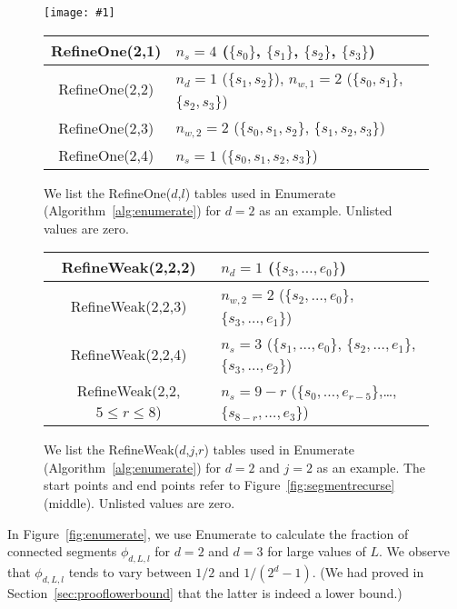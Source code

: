 \documentclass[a4paper,11pt]{article}
\newcommand{\inputtikz}[1]{\texttt{[image: \#1]}}
\newcommand{\figlab}[1]{\label{fig:#1}}
\newcommand{\figref}[1]{Figure~\ref{fig:#1}}
\newcommand{\secref}[1]{Section~\ref{sec:#1}}
\newcommand{\algref}[1]{Algorithm~\ref{alg:#1}}
\begin{document}
\begin{figure}\centering
  \inputtikz{refineone}

  \null

  \renewcommand{\arraystretch}{1.1}
  \begin{tabular}{|c|l|}\hline
    RefineOne(2,1) & $n_s = 4$ ($\{s_0\}$, $\{s_1\}$, $\{s_2\}$,
    $\{s_3\}$)
    \\ \hline
    RefineOne(2,2) & $n_d = 1$ ($\{s_1,s_2\}$), $n_{w,1} = 2$ ($\{s_0,s_1\}$,
    $\{s_2,s_3\}$)
    \\ \hline
    RefineOne(2,3) & $n_{w,2} = 2$ ($\{s_0,s_1,s_2\}$, $\{s_1,s_2,s_3\}$)
    \\ \hline
    RefineOne(2,4) & $n_s = 1$ ($\{s_0,s_1,s_2,s_3\}$)
    \\ \hline
  \end{tabular}
  \caption{We list the RefineOne($d$,$l$) tables used in Enumerate
    (\algref{enumerate}) for $d=2$ as an example.  Unlisted values are zero.}\figlab{refineone}
\end{figure}

\begin{figure}\centering
  \renewcommand{\arraystretch}{1.1}
  \begin{tabular}{|c|l|}\hline
    RefineWeak(2,2,2) & $n_d = 1$ ($\{s_3,\dots,e_0\}$)
    \\ \hline
    RefineWeak(2,2,3) & $n_{w,2} = 2$ ($\{s_2,\dots,e_0\}$,
    $\{s_3,\dots,e_1\}$)
    \\ \hline
    RefineWeak(2,2,4) & $n_s = 3$ ($\{s_1,\dots,e_0\}$,
    $\{s_2,\dots,e_1\}$, $\{s_3,\dots,e_2\}$)
    \\ \hline
    RefineWeak(2,2,$5\leq r\leq 8$) &
    $n_s = 9-r$ ($\{s_0,\dots,e_{r-5}\}$,\dots,$\{s_{8-r},\dots,e_{3}\}$)
    \\ \hline
  \end{tabular}
  \caption{We list the RefineWeak($d$,$j$,$r$) tables used in Enumerate
    (\algref{enumerate}) for $d=2$ and $j=2$ as an example.  The start points
    and end points refer to \figref{segmentrecurse} (middle).  Unlisted values
    are zero.}\figlab{refineweak}
\end{figure}

In \figref{enumerate}, we use Enumerate to calculate the fraction of connected
segments $\phi_{d,L,l}$ for $d=2$ and $d=3$ for large values of $L$.  We
observe that $\phi_{d,L,l}$ tends to vary between $1/2$ and
$1/(2^d-1)$.
(We had proved in \secref{prooflowerbound} that the latter is indeed a lower
bound.)
\end{document}
